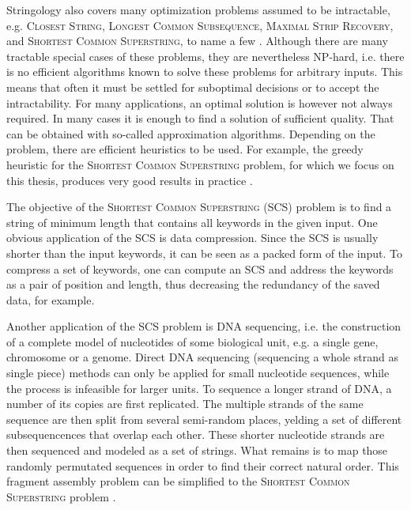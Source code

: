 \documentclass[english,twoside,censored,csm,algorithms-track-2020]{HYthesisML}
\theoremstyle{plain}
\theoremstyle{definition}
\begin{document}
Stringology also covers many optimization problems assumed to be intractable, e.g. 
\textsc{Closest String},
\textsc{Longest Common Subsequence},
\textsc{Maximal Strip Recovery},
and
\textsc{Shortest Common Superstring},
to name a few \citep{Bulteau14}.
Although there are many tractable special cases of these problems, they are nevertheless
\textsc{NP}-hard, i.e. there is no efficient algorithms known to solve these
problems for arbitrary inputs.
This means that often it must be settled for suboptimal decisions
or to accept the intractability.
For many applications, an optimal solution is however not always required. In many cases it is
enough to find a solution of sufficient quality.
That can be obtained with so-called approximation algorithms.
Depending on the problem, there are efficient heuristics to be used. For example, the
greedy heuristic for the \textsc{Shortest Common Superstring} problem, for which we focus on this
thesis, produces very good results in practice \citep{Romero04}. 

The objective of the \textsc{Shortest Common Superstring} (SCS) problem is to find a string of
minimum length that contains all keywords in the given input.
One obvious application of the SCS is data compression. Since the SCS is usually shorter
than the input keywords, it can be seen as a packed form of the input. To compress a set of keywords,
one can compute an SCS and address the keywords as a pair of position and length, thus decreasing
the redundancy of the saved data, for example.

Another application of the SCS problem is DNA sequencing, i.e. the construction of a complete
model of nucleotides of some biological unit, e.g. a single gene, chromosome or a genome. 
Direct DNA sequencing (sequencing a whole strand as single piece) methods can only be applied for
small nucleotide sequences,
while the process is infeasible for larger units. To sequence a longer strand of DNA,
a number of its copies are
first replicated. The multiple strands of the same sequence are then split from several semi-random
places, yelding a set of different subsequencences that overlap each other. These shorter nucleotide
strands are then sequenced and modeled as a set of strings. What remains is to map
those randomly permutated sequences in order to find their correct natural order.
This fragment assembly problem can be simplified to the \textsc{Shortest Common Superstring}
problem \citep{Peltola83}.
\end{document}
